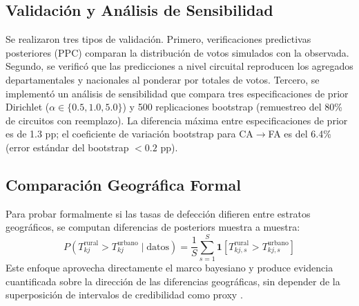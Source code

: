 \subsection{Validación y Análisis de Sensibilidad}

Se realizaron tres tipos de validación. Primero, verificaciones predictivas posteriores (PPC) comparan la distribución de votos simulados con la observada. Segundo, se verificó que las predicciones a nivel circuital reproducen los agregados departamentales y nacionales al ponderar por totales de votos. Tercero, se implementó un análisis de sensibilidad que compara tres especificaciones de prior Dirichlet ($\alpha \in \{0.5, 1.0, 5.0\}$) y 500 replicaciones bootstrap (remuestreo del 80\% de circuitos con reemplazo). La diferencia máxima entre especificaciones de prior es de 1.3 pp; el coeficiente de variación bootstrap para CA$\to$FA es del 6.4\% (error estándar del bootstrap $< 0.2$ pp).

\subsection{Comparación Geográfica Formal}

Para probar formalmente si las tasas de defección difieren entre estratos geográficos, se computan diferencias de posteriors muestra a muestra:
\begin{equation}
P\!\left(T_{kj}^{\text{rural}} > T_{kj}^{\text{urbano}} \mid \text{datos}\right) = \frac{1}{S}\sum_{s=1}^S \mathbf{1}\!\left[T_{kj,s}^{\text{rural}} > T_{kj,s}^{\text{urbano}}\right]
\end{equation}
Este enfoque aprovecha directamente el marco bayesiano y produce evidencia cuantificada sobre la dirección de las diferencias geográficas, sin depender de la superposición de intervalos de credibilidad como proxy \citep{gelman2013bayesian}.
